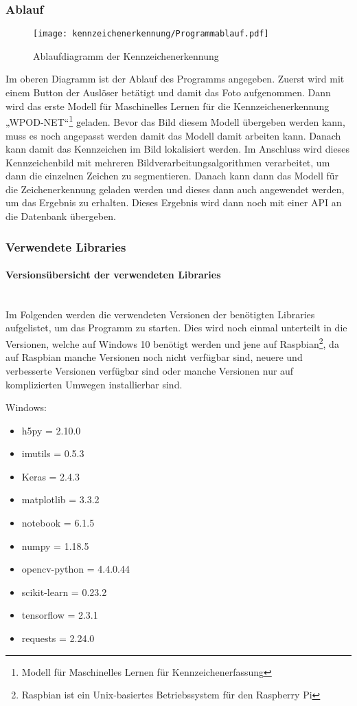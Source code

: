 \subsubsection{Ablauf}

\begin{figure}[H]
    \centering
    \texttt{[image: kennzeichenerkennung/Programmablauf.pdf]}
    \caption{Ablaufdiagramm der Kennzeichenerkennung}
\end{figure}

Im oberen Diagramm ist der Ablauf des Programms angegeben. Zuerst wird mit einem Button der Auslöser betätigt und damit das 
Foto aufgenommen. Dann wird das erste Modell für Maschinelles Lernen für die Kennzeichenerkennung „WPOD-NET“\footnote{Modell für Maschinelles Lernen für Kennzeichenerfassung} geladen. Bevor das 
Bild diesem Modell übergeben werden kann, muss es noch angepasst werden damit das Modell damit arbeiten kann. Danach kann 
damit das Kennzeichen im Bild lokalisiert werden. Im Anschluss wird dieses Kennzeichenbild mit mehreren Bildverarbeitungsalgorithmen 
verarbeitet, um dann die einzelnen Zeichen zu segmentieren. Danach kann dann das Modell für die Zeichenerkennung geladen 
werden und dieses dann auch angewendet werden, um das Ergebnis zu erhalten. Dieses Ergebnis wird dann noch mit einer API an die Datenbank übergeben.

\subsubsection{Verwendete Libraries}

\paragraph{Versionsübersicht der verwendeten Libraries}\mbox{}\\
Im Folgenden werden die verwendeten Versionen der benötigten Libraries aufgelistet, um das Programm zu starten. Dies wird noch einmal 
unterteilt in die Versionen, welche auf Windows 10 benötigt werden und jene auf Raspbian\footnote{Raspbian ist ein Unix-basiertes Betriebssystem für den Raspberry Pi}, da auf Raspbian manche Versionen noch 
nicht verfügbar sind, neuere und verbesserte Versionen verfügbar sind oder manche Versionen nur auf komplizierten Umwegen installierbar sind.

Windows:

\begin{itemize}
    \item h5py = 2.10.0
    \item imutils = 0.5.3
    \item Keras = 2.4.3
    \item matplotlib = 3.3.2
    \item notebook = 6.1.5
    \item numpy = 1.18.5
    \item opencv-python = 4.4.0.44
    \item scikit-learn = 0.23.2
    \item tensorflow = 2.3.1
    \item requests = 2.24.0
\end{itemize}

